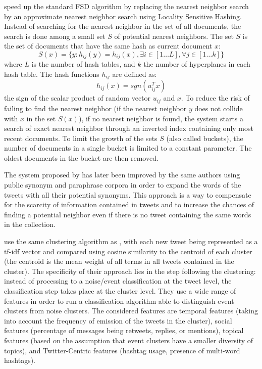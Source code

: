 \citet{petrovic_streaming_2010} speed up the standard FSD algorithm by replacing the nearest neighbor search by an approximate nearest neighbor search using Locality Sensitive Hashing. Instead of searching for the nearest neighbor in the set of all documents, the search is done among a small set $S$ of potential nearest neighbors. The set $S$ is the set of documents that have the same hash as current document $x$:
$$
S(x) = \{y: h_{ij}(y) = h_{ij}(x), \exists i \in [1 \ldots L], \forall j \in [1 \ldots k]\}
$$
where $L$ is the number of hash tables, and $k$ the number of hyperplanes in each hash table. The hash functions $h_{ij}$ are defined as:
$$
h_{ij}(x) = sgn(u_{ij}^Tx)
$$
the sign of the scalar product of random vector $u_{ij}$ and $x$. To reduce the risk of failing to find the nearest neighbor (if the nearest neighbor $y$ does not collide with $x$ in the set $S(x)$), if no nearest neighbor is found, the system starts a search of exact nearest neighbor through an inverted index containing only most recent documents. To limit the growth of the sets $S$ (also called buckets), the number of documents in a single bucket is limited to a constant parameter. The oldest documents in the bucket are then removed. 

The system proposed by \citet{petrovic_streaming_2010} has later been improved by the same authors \citep{petrovic_using_2012} using public synonym and paraphrase corpora in order to expand the words of the tweets with all their potential synonyms. This approach is a way to compensate for the scarcity of information contained in tweets and to increase the chances of finding a potential neighbor even if there is no tweet containing the same words in the collection.

\citet{becker_beyond_2011} use the same clustering algorithm as \citet{sankaranarayanan_twitterstand:_2009}, with each new tweet being represented as a tf-idf vector and compared using cosine similarity to the centroid of each cluster (the centroid is the mean weight of all terms in all tweets contained in the cluster). The specificity of their approach lies in the step following the clustering: instead of processing to a noise/event classification at the tweet level, the classification step takes place at the cluster level. They use a wide range of features in order to run a classification algorithm able to distinguish event clusters from noise clusters. The considered features are temporal features (taking into account the frequency of emission of the tweets in the cluster), social features (percentage of messages being retweets, replies, or mentions), topical features (based on the assumption that event clusters have a smaller diversity of topics), and Twitter-Centric features (hashtag usage, presence of multi-word hashtags).

